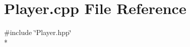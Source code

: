 \section{Player.\-cpp File Reference}
\label{_player_8cpp}
{\ttfamily \#include \char`\"{}Player.\-hpp\char`\"{}}\\*
